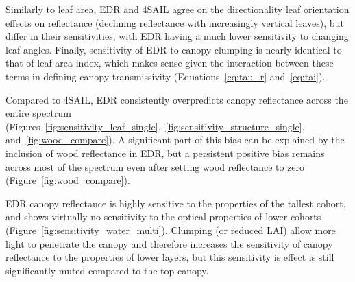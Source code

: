 Similarly to leaf area, EDR and 4SAIL agree on the directionality leaf orientation effects on reflectance (declining reflectance with increasingly vertical leaves), but differ in their sensitivities, with EDR having a much lower sensitivity to changing leaf angles.
Finally, sensitivity of EDR to canopy clumping is nearly identical to that of leaf area index, which makes sense given the interaction between these terms in defining canopy transmissivity (Equations~\ref{eq:tau_r} and~\ref{eq:tai}).


Compared to 4SAIL, EDR consistently overpredicts canopy reflectance across the entire spectrum (Figures~\ref{fig:sensitivity_leaf_single},~\ref{fig:sensitivity_structure_single}, and~\ref{fig:wood_compare}).
A significant part of this bias can be explained by the inclusion of wood reflectance in EDR, but a persistent positive bias remains across most of the spectrum even after setting wood reflectance to zero (Figure~\ref{fig:wood_compare}).


EDR canopy reflectance is highly sensitive to the properties of the tallest cohort, and shows virtually no sensitivity to the optical properties of lower cohorts (Figure~\ref{fig:sensitivity_water_multi}).
Clumping (or reduced LAI) allow more light to penetrate the canopy and therefore increases the sensitivity of canopy reflectance to the properties of lower layers, but this sensitivity is effect is still significantly muted compared to the top canopy.
